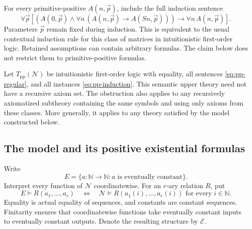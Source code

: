 For every primitive-positive $A(n,\vec p)$, include the full induction
sentence
\[
 \forall\vec p\left[
 \left(A(0,\vec p)\wedge
       \forall n\,(A(n,\vec p)\to A(Sn,\vec p))\right)
 \to \forall n\,A(n,\vec p)\right].
 \tag{PPI}\label{eq:pp-induction}
\]
Parameters $\vec p$ remain fixed during induction.  This is equivalent
to the usual contextual induction rule for this class of matrices in
intuitionistic first-order logic.  Retained assumptions can contain
arbitrary formulas.  The claim below does not restrict them to
primitive-positive formulas.

Let $T_{\mathrm{pp}}(\mathcal N)$ be intuitionistic first-order logic
with equality, all sentences \eqref{eq:pp-regular}, and all instances
\eqref{eq:pp-induction}.  This semantic upper theory need not have a
recursive axiom set.  The obstruction also applies to any recursively
axiomatized subtheory containing the same symbols and using only axioms
from these classes.  More generally, it applies to any theory satisfied
by the model constructed below.

\subsection{The model and its positive existential formulas}

Write
\[
 E=\{a\colon\mathbb N\to\mathbb N:
       a\text{ is eventually constant}\}.
\]
Interpret every function of $\mathcal N$ coordinatewise.  For an
$r$-ary relation $R$, put
\[
 E\models R(a_1,\ldots,a_r)
 \quad\Longleftrightarrow\quad
 \mathcal N\models R(a_1(i),\ldots,a_r(i))
       \text{ for every }i\in\mathbb N.
\]
Equality is actual equality of sequences, and constants are constant
sequences.  Finitarity ensures that coordinatewise functions take
eventually constant inputs to eventually constant outputs.  Denote the
resulting structure by $\mathcal E$.

